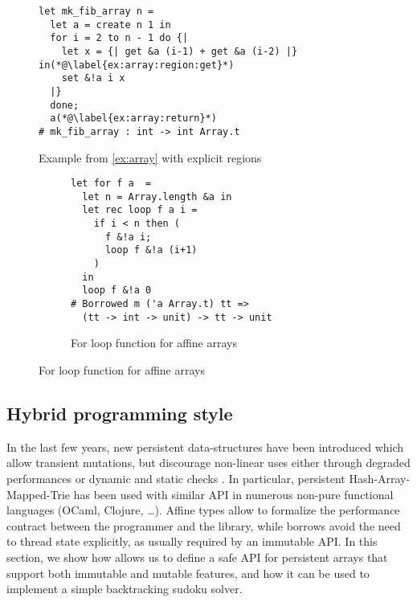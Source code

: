 \begin{figure}
  \centering
\begin{lstlisting}
let mk_fib_array n =
  let a = create n 1 in
  for i = 2 to n - 1 do {|
    let x = {| get &a (i-1) + get &a (i-2) |} in(*@\label{ex:array:region:get}*)
    set &!a i x
  |}
  done;
  a(*@\label{ex:array:return}*)
# mk_fib_array : int -> int Array.t
\end{lstlisting}
    \caption{Example from \cref{ex:array} with explicit regions}
    \label{ex:array:region}
\end{figure}



\begin{figure}
  \centering
  \begin{subfigure}{0.5\linewidth}
\begin{lstlisting}
let for f a  = 
  let n = Array.length &a in
  let rec loop f a i = 
    if i < n then (
      f &!a i;
      loop f &!a (i+1)
    )
  in
  loop f &!a 0
# Borrowed m ('a Array.t) tt =>
  (tt -> int -> unit) -> tt -> unit
\end{lstlisting}
    \caption{For loop function for affine arrays}
    \label{ex:array:for}
  \end{subfigure}
\end{figure}

\subsection{Hybrid programming style}

In the last few years, new persistent data-structures
have been introduced which allow transient mutations, but discourage
non-linear uses either through degraded performances
\cite{DBLP:conf/ml/ConchonF07} or
dynamic and static checks \cite{DBLP:journals/pacmpl/Puente17}.
In particular, persistent Hash-Array-Mapped-Trie has been used with similar
API in numerous non-pure functional languages (OCaml, Clojure, \dots).
Affine types allow to formalize the performance contract between the programmer
and the library, while borrows avoid the need to thread state explicitly,
as usually required by an immutable API.
%
In this section, we show how \lang allows us to define
a safe API for persistent arrays that support both immutable and mutable features,
and how it can be used to implement a simple backtracking sudoku solver.

